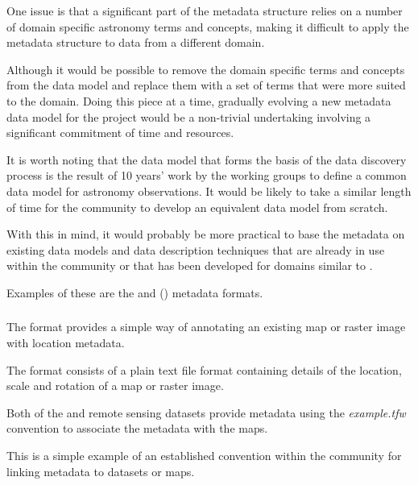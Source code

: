 \documentclass{article}
\begin{document}
One issue is that a significant part of the \cite{ivoa} metadata structure
relies on a number of domain specific astronomy terms and concepts, making
it difficult to apply the \cite{ivoa} metadata structure to data from a
different domain.

Although it would be possible to remove the domain specific terms and
concepts from the \cite{ivoa} data model and replace them with a set of
terms that were more suited to the \cite{trop} domain.
Doing this piece at a time, gradually evolving a new metadata data model
for the \cite{trop} project would be a non-trivial undertaking involving
a significant commitment of time and resources.

It is worth noting that the \cite{ivoa} \cite{ivoa-obscore} data model that
forms the basis of the \cite{ivoa} data discovery process is the result
of 10 years' work by the \cite{ivoa} working groups to define a common data
model for astronomy observations.
It would be likely to take a similar length of time for the \cite{trop}
community to develop an equivalent data model from scratch.

With this in mind, it would probably be more practical to base the \cite{trop}
metadata on existing data models and data description techniques that are
already in use within the \cite{trop} community or that has been developed
for domains similar to \cite{trop}.

Examples of these are the  and 
(\cite{eml}) metadata formats.

\subsubsection{}

The  format provides a simple way of annotating
an existing map or raster image with \cite{gis} location metadata.

The \cite{format-world} format consists of a plain text file format containing
details of the location, scale and rotation of a map or raster image.

Both of the \cite{saatchi-2011} and \cite{baccini-2012} remote sensing
datasets provide \cite{format-world} metadata using the \textit{example.tfw}
convention to associate the metadata with the \cite{format-geotiff} maps.

This is a simple example of an established convention within the \cite{gis}
community for linking \cite{gis} metadata to datasets or maps.
\end{document}
